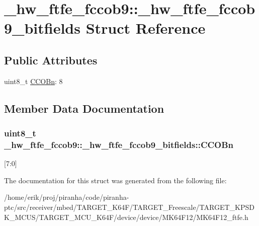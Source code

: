 \hypertarget{struct__hw__ftfe__fccob9_1_1__hw__ftfe__fccob9__bitfields}{}\section{\+\_\+hw\+\_\+ftfe\+\_\+fccob9\+:\+:\+\_\+hw\+\_\+ftfe\+\_\+fccob9\+\_\+bitfields Struct Reference}
\label{struct__hw__ftfe__fccob9_1_1__hw__ftfe__fccob9__bitfields}
\subsection*{Public Attributes}
\begin{DoxyCompactItemize}
\item 
uint8\+\_\+t \hyperlink{struct__hw__ftfe__fccob9_1_1__hw__ftfe__fccob9__bitfields_ab089c72e394f5425006755fe5608b357}{C\+C\+O\+Bn}\+: 8
\end{DoxyCompactItemize}


\subsection{Member Data Documentation}
\subsubsection[{\texorpdfstring{C\+C\+O\+Bn}{CCOBn}}]{\setlength{\rightskip}{0pt plus 5cm}uint8\+\_\+t \+\_\+hw\+\_\+ftfe\+\_\+fccob9\+::\+\_\+hw\+\_\+ftfe\+\_\+fccob9\+\_\+bitfields\+::\+C\+C\+O\+Bn}\hypertarget{struct__hw__ftfe__fccob9_1_1__hw__ftfe__fccob9__bitfields_ab089c72e394f5425006755fe5608b357}{}\label{struct__hw__ftfe__fccob9_1_1__hw__ftfe__fccob9__bitfields_ab089c72e394f5425006755fe5608b357}
\mbox{[}7\+:0\mbox{]} 

The documentation for this struct was generated from the following file\+:\begin{DoxyCompactItemize}
\item 
/home/erik/proj/piranha/code/piranha-\/ptc/src/receiver/mbed/\+T\+A\+R\+G\+E\+T\+\_\+\+K64\+F/\+T\+A\+R\+G\+E\+T\+\_\+\+Freescale/\+T\+A\+R\+G\+E\+T\+\_\+\+K\+P\+S\+D\+K\+\_\+\+M\+C\+U\+S/\+T\+A\+R\+G\+E\+T\+\_\+\+M\+C\+U\+\_\+\+K64\+F/device/device/\+M\+K64\+F12/M\+K64\+F12\+\_\+ftfe.\+h\end{DoxyCompactItemize}
